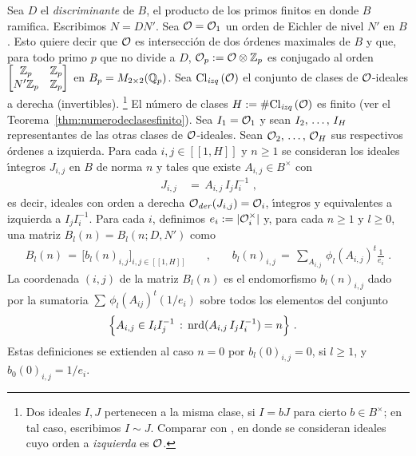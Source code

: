 Sea $D$ el \emph{discriminante} de $B$, el producto de los primos finitos en
donde $B$ ramifica. Escribimos $N=DN'$. Sea $\cal{O}=\cal{O}_{1}$ un orden de
Eichler de nivel $N'$ en $B$. Esto quiere decir que $\cal{O}$ es
intersecci\'{o}n de dos \'{o}rdenes maximales de $B$ y que, para todo primo $p$
que no divide a $D$, $\cal{O}_{p}:=\cal{O}\otimes\bb{Z}_{p}$ es conjugado al
orden
\begin{math}
	\begin{bmatrix} \bb{Z}_{p} & \bb{Z}_{p} \\
	N'\bb{Z}_{p} & \bb{Z}_{p} \end{bmatrix}
\end{math}
en $B_{p}=M_{2\times 2}(\bb{Q}_{p})$. Sea $\lClass{\cal{O}}$ el conjunto de
clases de $\cal{O}$-ideales a derecha (invertibles).%
\footnote{
	Dos ideales $I,J$ pertenecen a la misma clase, si $I=bJ$ para cierto
	$b\in B^{\times}$; en tal caso, escribimos $I\sim J$. Comparar con
	\cite[\S~II.5]{EichlerBasisProblem}, en donde se consideran
	ideales cuyo orden a \emph{izquierda} es $\cal{O}$.
}
El n\'{u}mero de clases $H:=\#\lClass{\cal{O}}$ es finito (ver el
Teorema~\ref{thm:numerodeclasesfinito}). Sea $I_{1}=\cal{O}_{1}$ y sean
$\lista[2]{I}{H}$ representantes de las otras clases de $\cal{O}$-ideales. Sean
$\lista[2]{\cal{O}}{H}$ sus respectivos \'{o}rdenes a izquierda. Para cada
$i,j\in[\![1,H]\!]$ y $n\geq 1$ se consideran los ideales \'{\i}ntegros $J_{i,j}$ en $B$ de norma $n$ y tales que existe $A_{i,j}\in B^{\times}$ con
\begin{align*}
	J_{i,j} & \,=\, A_{i,j}\,I_{j} I_{i}^{-1}
	\text{ ,}
\end{align*}
%
es decir, ideales con orden a derecha $\Oder(J_{i,j})=\cal{O}_{i}$,
\'{\i}ntegros y equivalentes a izquierda a $I_{j}I_{i}^{-1}$.
Para cada $i$, definimos $e_{i}:=|\cal{O}_{i}^{\times}|$ y, para cada $n\geq 1$
y $l\geq 0$, una matriz $B_{l}(n)=B_{l}(n;D,N')$ como
\begin{align*}
	B_{l}(n) \,=\,\Big[ b_{l}(n)_{i,j}\Big]_{i,j\in[\![1,H]\!]}
		& \quad\text{,}\qquad
		b_{l}(n)_{i,j}\,=\,\sum_{A_{i,j}}\,\phi_{l}(A_{i,j})^{t}
			\frac{1}{e_{i}}
	\text{ .}
\end{align*}
%
La coordenada $(i,j)$ de la matriz $B_{l}(n)$ es el endomorfismo
$b_{l}(n)_{i,j}$ dado por la sumatoria $\sum\,\phi_{l}(A_{ij})^{t}(1/e_{i})$
sobre todos los elementos del conjunto
\begin{align*}
	& \Big\{A_{i,j}\in I_{i}I_{j}^{-1}\,:\,
		\nrd(A_{i,j}\,I_{j}I_{i}^{-1})=n\Big\}
	\text{ .}
\end{align*}
%
Estas definiciones se extienden al caso $n=0$ por $b_{l}(0)_{i,j}=0$, si
$l\geq 1$, y $b_{0}(0)_{i,j}=1/e_{i}$.

